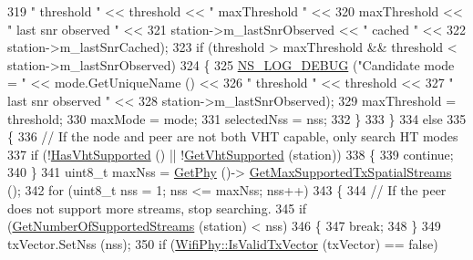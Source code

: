\begin{DoxyCode}
319                                 \textcolor{stringliteral}{" threshold "} << threshold  << \textcolor{stringliteral}{" maxThreshold "} <<
320                                 maxThreshold << \textcolor{stringliteral}{" last snr observed "} <<
321                                 station->m\_lastSnrObserved << \textcolor{stringliteral}{" cached "} <<
322                                 station->m\_lastSnrCached);
323                   \textcolor{keywordflow}{if} (threshold > maxThreshold && threshold < station->m\_lastSnrObserved)
324                     \{
325                       \hyperlink{group__logging_ga413f1886406d49f59a6a0a89b77b4d0a}{NS\_LOG\_DEBUG} (\textcolor{stringliteral}{"Candidate mode = "} << mode.GetUniqueName () <<
326                                     \textcolor{stringliteral}{" threshold "} << threshold  <<
327                                     \textcolor{stringliteral}{" last snr observed "} <<
328                                     station->m\_lastSnrObserved);
329                       maxThreshold = threshold;
330                       maxMode = mode;
331                       selectedNss = nss;
332                     \}
333                  \}
334               \textcolor{keywordflow}{else}
335                 \{
336                   \textcolor{comment}{// If the node and peer are not both VHT capable, only search HT modes}
337                   \textcolor{keywordflow}{if} (!\hyperlink{classns3_1_1WifiRemoteStationManager_afae2836c7785854272d73bf33e58c95a}{HasVhtSupported} () || !\hyperlink{classns3_1_1WifiRemoteStationManager_aecf5ed3203b9b55cd831696a08daa5fe}{GetVhtSupported} (station))
338                     \{
339                       \textcolor{keywordflow}{continue};
340                     \}
341                   uint8\_t maxNss = \hyperlink{classns3_1_1WifiRemoteStationManager_ab92b49cf78e0b72a51f5d13a1f15e242}{GetPhy} ()->
      \hyperlink{classns3_1_1WifiPhy_ab5e6bb95a75d0e6e7e666efd3c014fe4}{GetMaxSupportedTxSpatialStreams} ();
342                   \textcolor{keywordflow}{for} (uint8\_t nss = 1; nss <= maxNss; nss++)
343                     \{
344                       \textcolor{comment}{// If the peer does not support more streams, stop searching.}
345                       \textcolor{keywordflow}{if} (\hyperlink{classns3_1_1WifiRemoteStationManager_a5b08585f67c512242a2f3a53eeedade3}{GetNumberOfSupportedStreams} (station) < nss)
346                         \{
347                           \textcolor{keywordflow}{break};
348                         \}
349                       txVector.SetNss (nss);
350                       \textcolor{keywordflow}{if} (\hyperlink{classns3_1_1WifiPhy_a2df962f7fd9468b514ea16d5fbed97f6}{WifiPhy::IsValidTxVector} (txVector) == \textcolor{keyword}{false})

\end{DoxyCode}
